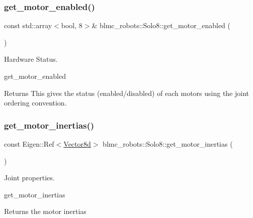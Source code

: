 \subsubsection{\texorpdfstring{get\+\_\+motor\+\_\+enabled()}{get\_motor\_enabled()}}
{\footnotesize\ttfamily const std\+::array$<$bool, 8$>$\& blmc\+\_\+robots\+::\+Solo8\+::get\+\_\+motor\+\_\+enabled (\begin{DoxyParamCaption}{ }\end{DoxyParamCaption})\hspace{0.3cm}{\ttfamily [inline]}}



Hardware Status. 

get\+\_\+motor\+\_\+enabled \begin{DoxyReturn}{Returns}
This gives the status (enabled/disabled) of each motors using the joint ordering convention. 
\end{DoxyReturn}
\mbox{\label{classblmc__robots_1_1Solo8_a61a01cd1309a28be108deb07eb4d2f3b}} 
\subsubsection{\texorpdfstring{get\+\_\+motor\+\_\+inertias()}{get\_motor\_inertias()}}
{\footnotesize\ttfamily const Eigen\+::\+Ref$<$\hyperlink{common__header_8hpp_a98975ffbe0bca1296078e0350dfedd60}{Vector8d}$>$ blmc\+\_\+robots\+::\+Solo8\+::get\+\_\+motor\+\_\+inertias (\begin{DoxyParamCaption}{ }\end{DoxyParamCaption})\hspace{0.3cm}{\ttfamily [inline]}}



Joint properties. 

get\+\_\+motor\+\_\+inertias \begin{DoxyReturn}{Returns}
the motor inertias 
\end{DoxyReturn}
\mbox{\label{classblmc__robots_1_1Solo8_a8c956e9a0a891992fa593b932a385095}} 
